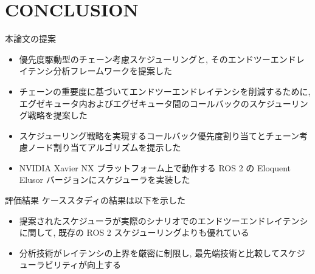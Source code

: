 
\section{CONCLUSION}
\label{sec: conslusion}

\begin{frame}{本論文の提案}
    \begin{itemize}
        \item 優先度駆動型のチェーン考慮スケジューリングと, そのエンドツーエンドレイテンシ分析フレームワークを提案した
        \item チェーンの重要度に基づいてエンドツーエンドレイテンシを削減するために, エグゼキュータ内およびエグゼキュータ間のコールバックのスケジューリング戦略を提案した
        \item スケジューリング戦略を実現するコールバック優先度割り当てとチェーン考慮ノード割り当てアルゴリズムを提示した
        \item NVIDIA Xavier NX プラットフォーム上で動作する ROS 2 の Eloquent Elusor バージョンにスケジューラを実装した
    \end{itemize}
\end{frame}

\begin{frame}{評価結果}
    ケーススタディの結果は以下を示した
    \begin{itemize}
        \item 提案されたスケジューラが実際のシナリオでのエンドツーエンドレイテンシに関して, 既存の ROS 2 スケジューリングよりも優れている
        \item 分析技術がレイテンシの上界を厳密に制限し, 最先端技術と比較してスケジューラビリティが向上する
    \end{itemize}
\end{frame}

